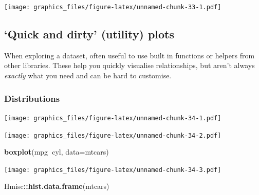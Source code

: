 \documentclass[]{article}
\newenvironment{Shaded}{\begin{snugshade}}{\end{snugshade}}
\newcommand{\DataTypeTok}[1]{\textcolor[rgb]{0.13,0.29,0.53}{#1}}
\newcommand{\KeywordTok}[1]{\textcolor[rgb]{0.13,0.29,0.53}{\textbf{#1}}}
\newcommand{\NormalTok}[1]{#1}
\newcommand{\OperatorTok}[1]{\textcolor[rgb]{0.81,0.36,0.00}{\textbf{#1}}}
\begin{document}
\texttt{[image: graphics\_files/figure-latex/unnamed-chunk-33-1.pdf]}

\hypertarget{utility-plotting-functions}{%
\subsection*{`Quick and dirty' (utility) plots}\label{utility-plotting-functions}}

When exploring a dataset, often useful to use built in functions or helpers from
other libraries. These help you quickly visualise relationships, but aren't
always \emph{exactly} what you need and can be hard to customise.

\hypertarget{distributions-1}{%
\subsubsection{Distributions}\label{distributions-1}}

\begin{Shaded}
\end{Shaded}

\texttt{[image: graphics\_files/figure-latex/unnamed-chunk-34-1.pdf]}

\begin{Shaded}
\end{Shaded}

\texttt{[image: graphics\_files/figure-latex/unnamed-chunk-34-2.pdf]}

\begin{Shaded}
\begin{Highlighting}[]
\KeywordTok{boxplot}\NormalTok{(mpg}\OperatorTok{~}\NormalTok{cyl, }\DataTypeTok{data=}\NormalTok{mtcars)}
\end{Highlighting}
\end{Shaded}

\texttt{[image: graphics\_files/figure-latex/unnamed-chunk-34-3.pdf]}

\begin{Shaded}
\begin{Highlighting}[]
\NormalTok{Hmisc}\OperatorTok{::}\KeywordTok{hist.data.frame}\NormalTok{(mtcars)}
\end{Highlighting}
\end{Shaded}
\end{document}
